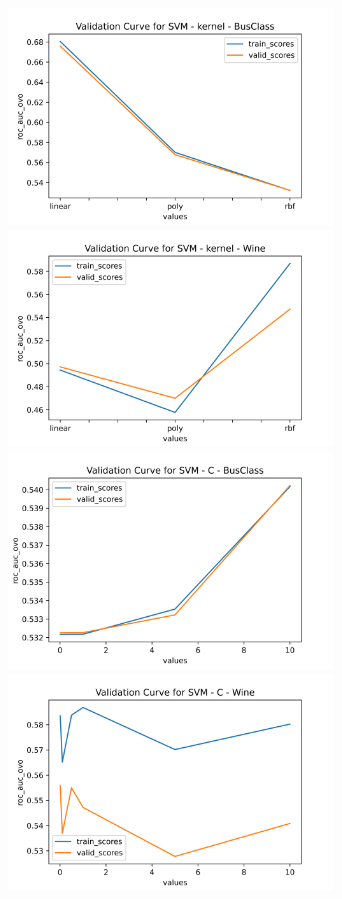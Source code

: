 \documentclass[
	letterpaper, %
]{jdf}
\begin{document}
\includegraphics[width=3.4in]{Figures/BusClass-0920/SVM/val_curve_0.png}
\includegraphics[width=3.4in]{Figures/Wine-0921/SVM/val_curve_0.png}
\includegraphics[width=3.4in]{Figures/BusClass-0920/SVM/val_curve_1.png}
\includegraphics[width=3.4in]{Figures/Wine-0921/SVM/val_curve_1.png}
\end{document}
